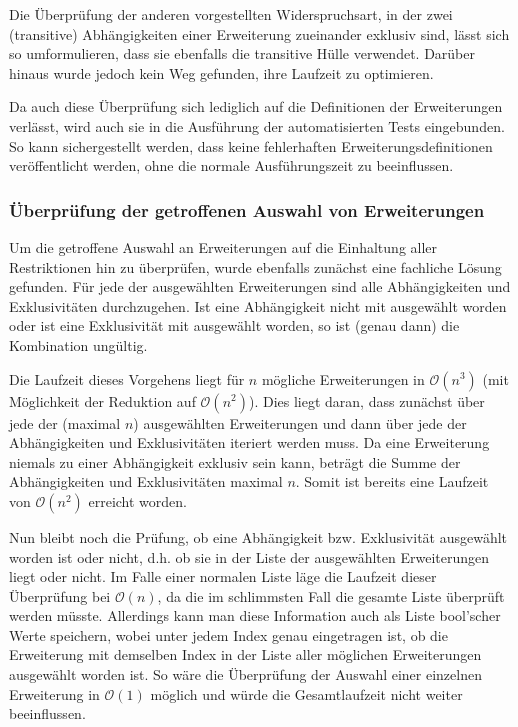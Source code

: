Die Überprüfung der anderen vorgestellten Widerspruchsart, in der zwei (transitive) Abhängigkeiten einer Erweiterung zueinander exklusiv sind, lässt sich so umformulieren, dass sie ebenfalls die transitive Hülle verwendet. Darüber hinaus wurde jedoch kein Weg gefunden, ihre Laufzeit zu optimieren.

Da auch diese Überprüfung sich lediglich auf die Definitionen der Erweiterungen verlässt, wird auch sie in die Ausführung der automatisierten Tests eingebunden. So kann sichergestellt werden, dass keine fehlerhaften Erweiterungsdefinitionen veröffentlicht werden, ohne die normale Ausführungszeit zu beeinflussen.

\subsubsection{Überprüfung der getroffenen Auswahl von Erweiterungen}
\label{impl:verify_chosen_extensions}
Um die getroffene Auswahl an Erweiterungen auf die Einhaltung aller Restriktionen hin zu überprüfen, wurde ebenfalls zunächst eine fachliche Lösung gefunden. Für jede der ausgewählten Erweiterungen sind alle Abhängigkeiten und Exklusivitäten durchzugehen. Ist eine Abhängigkeit nicht mit ausgewählt worden oder ist eine Exklusivität mit ausgewählt worden, so ist (genau dann) die Kombination ungültig.

Die Laufzeit dieses Vorgehens liegt für $n$ mögliche Erweiterungen in $\mathcal{O}(n^3)$ (mit Möglichkeit der Reduktion auf $\mathcal{O}(n^2)$). Dies liegt daran, dass zunächst über jede der (maximal $n$) ausgewählten Erweiterungen und dann über jede der Abhängigkeiten und Exklusivitäten iteriert werden muss. Da eine Erweiterung niemals zu einer Abhängigkeit exklusiv sein kann, beträgt die Summe der Abhängigkeiten und Exklusivitäten maximal $n$. Somit ist bereits eine Laufzeit von $\mathcal{O}(n^2)$ erreicht worden.

Nun bleibt noch die Prüfung, ob eine Abhängigkeit bzw. Exklusivität ausgewählt worden ist oder nicht, d.h. ob sie in der Liste der ausgewählten Erweiterungen liegt oder nicht. Im Falle einer normalen Liste läge die Laufzeit dieser Überprüfung bei $\mathcal{O}(n)$, da die im schlimmsten Fall die gesamte Liste überprüft werden müsste. Allerdings kann man diese Information auch als Liste bool'scher Werte speichern, wobei unter jedem Index genau eingetragen ist, ob die Erweiterung mit demselben Index in der Liste aller möglichen Erweiterungen ausgewählt worden ist. So wäre die Überprüfung der Auswahl einer einzelnen Erweiterung in $\mathcal{O}(1)$ möglich und würde die Gesamtlaufzeit nicht weiter beeinflussen.

